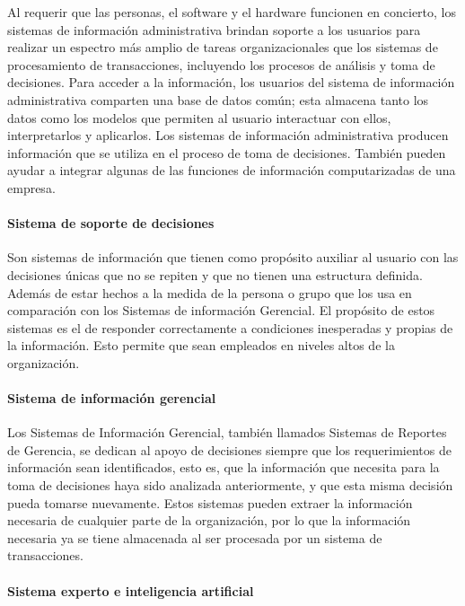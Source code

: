 Al requerir que las personas, el software y el hardware funcionen en concierto, los sistemas de información administrativa brindan soporte a los usuarios para realizar un espectro más amplio de tareas organizacionales que los sistemas de procesamiento de transacciones, incluyendo los procesos de análisis y toma de decisiones. Para acceder a la información, los usuarios del sistema de información administrativa comparten una base de datos común; esta almacena tanto los datos como los modelos que permiten al usuario interactuar con ellos, interpretarlos y aplicarlos. Los sistemas de información administrativa producen información que se utiliza en el proceso de toma de decisiones. También pueden ayudar a integrar algunas de las funciones de información computarizadas de una empresa. 

\paragraph{Sistema de soporte de decisiones}

Son sistemas de información que tienen como propósito auxiliar al usuario con las decisiones únicas que no se repiten y que no tienen una estructura definida. Además de estar hechos a la medida de la persona o grupo que los usa en comparación con los Sistemas de información Gerencial. El propósito de estos sistemas es el de responder correctamente a condiciones inesperadas y propias de la información. Esto permite que sean empleados en niveles altos de la organización.  

\paragraph{Sistema de información gerencial}

Los Sistemas de Información Gerencial, también llamados Sistemas de Reportes de Gerencia, se dedican al apoyo de decisiones siempre que los requerimientos de información sean identificados, esto es, que la información que necesita para la toma de decisiones haya sido analizada anteriormente, y que esta misma decisión pueda tomarse nuevamente. Estos sistemas pueden extraer la información necesaria de cualquier parte de la organización, por lo que la información necesaria ya se tiene almacenada al ser procesada por un sistema de transacciones. 


\paragraph{Sistema experto e inteligencia artificial }

